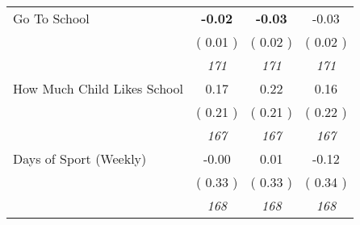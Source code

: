 \begin{tabular}{l c c c}
Go To School & \textbf{     -0.02 } & \textbf{     -0.03 } &     -0.03 \\
& (     0.01 ) & (     0.02 ) & (     0.02 ) \\
& \textit{ 171 } & \textit{ 171 } & \textit{ 171 } \\
How Much Child Likes School &      0.17 &      0.22 &      0.16 \\
& (     0.21 ) & (     0.21 ) & (     0.22 ) \\
& \textit{ 167 } & \textit{ 167 } & \textit{ 167 } \\
Days of Sport (Weekly) &     -0.00 &      0.01 &     -0.12 \\
& (     0.33 ) & (     0.33 ) & (     0.34 ) \\
& \textit{ 168 } & \textit{ 168 } & \textit{ 168 } \\
\bottomrule
\end{tabular}
